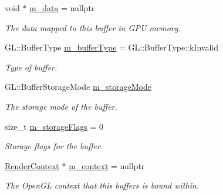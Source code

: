 \begin{Indent}
\begin{DoxyCompactItemize}
void $\ast$ \mbox{\hyperlink{classrev_1_1_g_l_buffer_a314ef90b0e12e3174fddaa8cb65c0857}{m\+\_\+data}} = nullptr
\begin{DoxyCompactList}\small\item\em The data mapped to this buffer in G\+PU memory. \end{DoxyCompactList}\item 
\mbox{\label{classrev_1_1_g_l_buffer_a9582ed032ec8f98c5821b3714706f990}} 
G\+L\+::\+Buffer\+Type \mbox{\hyperlink{classrev_1_1_g_l_buffer_a9582ed032ec8f98c5821b3714706f990}{m\+\_\+buffer\+Type}} = G\+L\+::\+Buffer\+Type\+::k\+Invalid
\begin{DoxyCompactList}\small\item\em Type of buffer. \end{DoxyCompactList}\item 
\mbox{\label{classrev_1_1_g_l_buffer_ab563d8763466fea7079f655756af863a}} 
G\+L\+::\+Buffer\+Storage\+Mode \mbox{\hyperlink{classrev_1_1_g_l_buffer_ab563d8763466fea7079f655756af863a}{m\+\_\+storage\+Mode}}
\begin{DoxyCompactList}\small\item\em The storage mode of the buffer. \end{DoxyCompactList}\item 
\mbox{\label{classrev_1_1_g_l_buffer_a8a820a358244b54dd74bde54aa5dc1b6}} 
size\+\_\+t \mbox{\hyperlink{classrev_1_1_g_l_buffer_a8a820a358244b54dd74bde54aa5dc1b6}{m\+\_\+storage\+Flags}} = 0
\begin{DoxyCompactList}\small\item\em Storage flags for the buffer. \end{DoxyCompactList}\item 
\mbox{\label{classrev_1_1_g_l_buffer_a19992882c4866c7157b168c6a1ea2443}} 
\mbox{\hyperlink{classrev_1_1_render_context}{Render\+Context}} $\ast$ \mbox{\hyperlink{classrev_1_1_g_l_buffer_a19992882c4866c7157b168c6a1ea2443}{m\+\_\+context}} = nullptr
\begin{DoxyCompactList}\small\item\em The Open\+GL context that this buffers is bound within. \end{DoxyCompactList}\end{DoxyCompactItemize}
\end{Indent}
